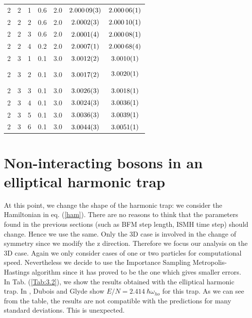 \begin{table}[H]
\begin{tabular}{c c c c |c c c}
2 & 2 & 1 &0.6 & 2.0  & $\SI{2.00009\pm 0.00003}{}$ & $\SI{2.00006\pm 0.00001}{}$ \\
2 & 2 & 2 &0.6 & 2.0   & $\SI{2.0002\pm 0.0003}{}$ & $\SI{2.00010\pm 0.00001}{}$ \\
2 & 2 & 3 &0.6 & 2.0   & $\SI{2.0001\pm 0.0004}{}$ & $\SI{2.00008\pm 0.00001}{}$ \\
2 & 2 & 4 &0.2 & 2.0   & $\SI{2.0007\pm 0.0001}{}$ & $\SI{2.00068\pm 0.00004}{}$ \\ \hline 
2 & 3 & 1 &0.1 & 3.0   &   $\SI{3.0012\pm 0.0002}{}$&  $\SI{3.0010\pm 0.0001}{}$ \\
2 & 3 & 2 &0.1 & 3.0   &   $\SI{3.0017\pm 0.0002}{}$&  $$\SI{3.0020\pm 0.0001}{}$$ \\
2 & 3 & 3 &0.1 & 3.0   &  $\SI{3.0026\pm 0.0003}{}$&    $\SI{3.0018\pm 0.0001}{}$ \\
2 & 3 & 4 &0.1 & 3.0   &  $\SI{3.0024\pm 0.0003}{}$&   $\SI{3.0036\pm 0.0001}{}$ \\
2 & 3 & 5 &0.1 & 3.0  &  $\SI{3.0036\pm 0.0003}{}$  &  $\SI{3.0039\pm 0.0001}{}$  \\
2 & 3 & 6 &0.1 & 3.0   &  $\SI{3.0044\pm 0.0003}{}$   & $\SI{3.0051\pm 0.0001}{}$  \\ 
\end{tabular}
\label{Tab:3}
\end{table} 

\section{Non-interacting bosons in an elliptical harmonic trap}
At this point, we change the shape of the harmonic trap: we consider the Hamiltonian in eq. (\ref{ham}). There are no reasons to think that the parameters found in the previous sections (such as BFM step length, ISMH time step) should change. Hence we use the same. Only the 3D case is involved in the change of symmetry since we modify the z direction. Therefore we focus our analysis on the 3D case. Again we only consider cases of one or two particles for computational speed. Nevertheless we decide to use the Importance Sampling Metropolis-Hastings algorithm since it has proved to be the one which gives smaller errors.  In Tab. (\ref{Tab:3.2}), we show the results obtained with the elliptical harmonic trap. In \cite{vmcarticle}, Dubois and Glyde show $E/N=2.414\ \hbar\omega_{ho}$ for this trap. As we can see from the table, the results are not compatible with the predictions for many standard deviations. This is unexpected. 

